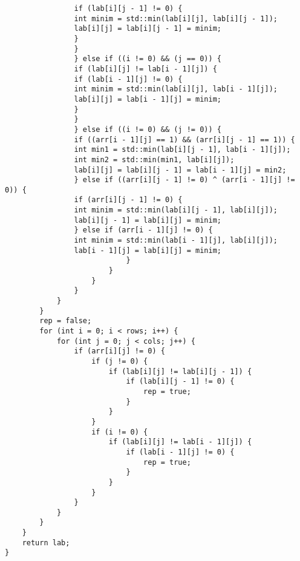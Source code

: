 \documentclass{report}
\begin{document}
\begin{lstlisting}
                if (lab[i][j - 1] != 0) {
                int minim = std::min(lab[i][j], lab[i][j - 1]);
                lab[i][j] = lab[i][j - 1] = minim;
                }
                }
                } else if ((i != 0) && (j == 0)) {
                if (lab[i][j] != lab[i - 1][j]) {
                if (lab[i - 1][j] != 0) {
                int minim = std::min(lab[i][j], lab[i - 1][j]);
                lab[i][j] = lab[i - 1][j] = minim;
                }
                }
                } else if ((i != 0) && (j != 0)) {
                if ((arr[i - 1][j] == 1) && (arr[i][j - 1] == 1)) {
                int min1 = std::min(lab[i][j - 1], lab[i - 1][j]);
                int min2 = std::min(min1, lab[i][j]);
                lab[i][j] = lab[i][j - 1] = lab[i - 1][j] = min2;
                } else if ((arr[i][j - 1] != 0) ^ (arr[i - 1][j] != 0)) {
                if (arr[i][j - 1] != 0) {
                int minim = std::min(lab[i][j - 1], lab[i][j]);
                lab[i][j - 1] = lab[i][j] = minim;
                } else if (arr[i - 1][j] != 0) {
                int minim = std::min(lab[i - 1][j], lab[i][j]);
                lab[i - 1][j] = lab[i][j] = minim;
                            }
                        }
                    }
                }
            }
        }
        rep = false;
        for (int i = 0; i < rows; i++) {
            for (int j = 0; j < cols; j++) {
                if (arr[i][j] != 0) {
                    if (j != 0) {
                        if (lab[i][j] != lab[i][j - 1]) {
                            if (lab[i][j - 1] != 0) {
                                rep = true;
                            }
                        }
                    }
                    if (i != 0) {
                        if (lab[i][j] != lab[i - 1][j]) {
                            if (lab[i - 1][j] != 0) {
                                rep = true;
                            }
                        }
                    }
                }
            }
        }
    }
    return lab;
}


\end{lstlisting}
\end{document}

